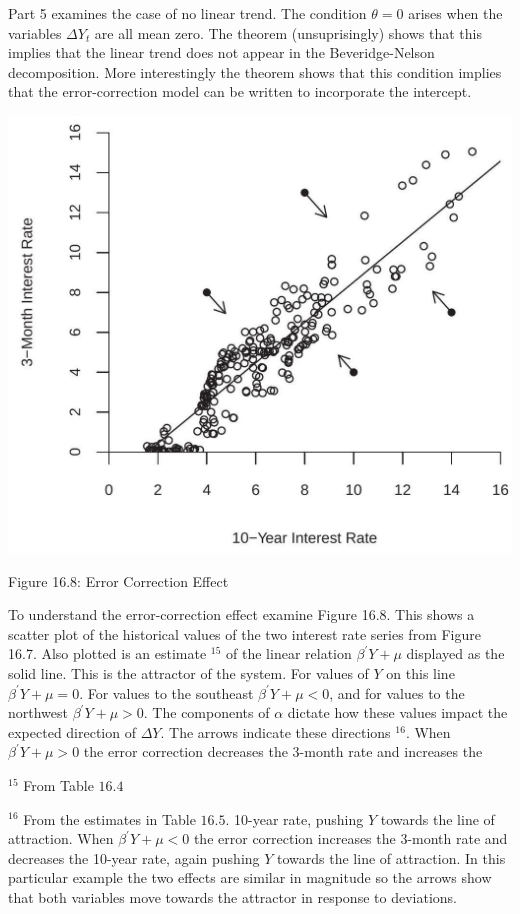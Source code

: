 \documentclass[10pt]{article}
\begin{document}
Part 5 examines the case of no linear trend. The condition $\theta=0$ arises when the variables $\Delta Y_{t}$ are all mean zero. The theorem (unsuprisingly) shows that this implies that the linear trend does not appear in the Beveridge-Nelson decomposition. More interestingly the theorem shows that this condition implies that the error-correction model can be written to incorporate the intercept.

\includegraphics[max width=\textwidth]{2022_10_23_e99fc7c58db661c6f219g-33}

Figure 16.8: Error Correction Effect

To understand the error-correction effect examine Figure 16.8. This shows a scatter plot of the historical values of the two interest rate series from Figure 16.7. Also plotted is an estimate ${ }^{15}$ of the linear relation $\beta^{\prime} Y+\mu$ displayed as the solid line. This is the attractor of the system. For values of $Y$ on this line $\beta^{\prime} Y+\mu=0$. For values to the southeast $\beta^{\prime} Y+\mu<0$, and for values to the northwest $\beta^{\prime} Y+\mu>0$. The components of $\alpha$ dictate how these values impact the expected direction of $\Delta Y$. The arrows indicate these directions ${ }^{16}$. When $\beta^{\prime} Y+\mu>0$ the error correction decreases the 3-month rate and increases the

${ }^{15}$ From Table $16.4$

${ }^{16}$ From the estimates in Table $16.5$. 10-year rate, pushing $Y$ towards the line of attraction. When $\beta^{\prime} Y+\mu<0$ the error correction increases the 3-month rate and decreases the 10-year rate, again pushing $Y$ towards the line of attraction. In this particular example the two effects are similar in magnitude so the arrows show that both variables move towards the attractor in response to deviations.
\end{document}
